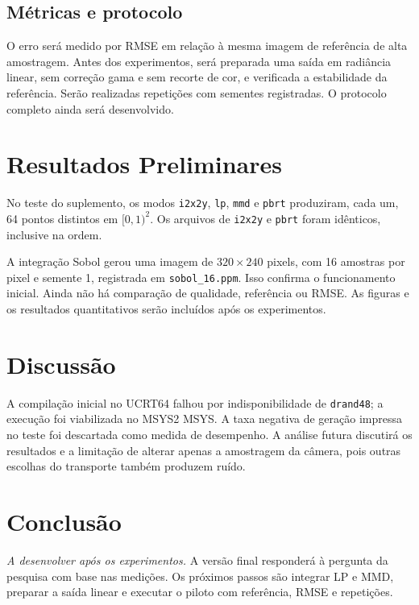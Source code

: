 \documentclass[9pt,a4paper,twocolumn]{extarticle}
\begin{document}
\subsection{Métricas e protocolo}
O erro será medido por RMSE em relação à mesma imagem de referência de alta amostragem. Antes dos experimentos, será preparada uma saída em radiância linear, sem correção gama e sem recorte de cor, e verificada a estabilidade da referência. Serão realizadas repetições com sementes registradas. O protocolo completo ainda será desenvolvido.

\section{Resultados Preliminares}
No teste do suplemento, os modos \texttt{i2x2y}, \texttt{lp}, \texttt{mmd} e \texttt{pbrt} produziram, cada um, 64 pontos distintos em $[0,1)^2$. Os arquivos de \texttt{i2x2y} e \texttt{pbrt} foram idênticos, inclusive na ordem.

A integração Sobol gerou uma imagem de $320\times240$ pixels, com 16 amostras por pixel e semente 1, registrada em \texttt{sobol\_16.ppm}. Isso confirma o funcionamento inicial. Ainda não há comparação de qualidade, referência ou RMSE. As figuras e os resultados quantitativos serão incluídos após os experimentos.

\section{Discussão}
A compilação inicial no UCRT64 falhou por indisponibilidade de \texttt{drand48}; a execução foi viabilizada no MSYS2 MSYS. A taxa negativa de geração impressa no teste foi descartada como medida de desempenho. A análise futura discutirá os resultados e a limitação de alterar apenas a amostragem da câmera, pois outras escolhas do transporte também produzem ruído.

\section{Conclusão}
\textit{A desenvolver após os experimentos.} A versão final responderá à pergunta da pesquisa com base nas medições. Os próximos passos são integrar LP e MMD, preparar a saída linear e executar o piloto com referência, RMSE e repetições.

\balance
\printbibliography[title={Referências}]
\end{document}
